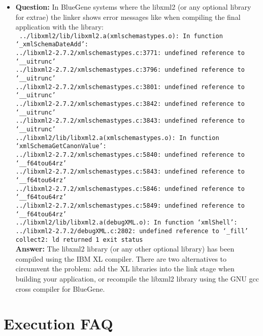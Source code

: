 \begin{itemize}
\item {\bf Question:} In BlueGene systems where the libxml2 (or any optional library for extrae) the linker shows error messages like when compiling the final application with the \TRACE library:\\
			{\tt
			../libxml2/lib/libxml2.a(xmlschemastypes.o): In function `\_xmlSchemaDateAdd':\\
			../libxml2-2.7.2/xmlschemastypes.c:3771: undefined reference to `\_\_uitrunc'\\
			../libxml2-2.7.2/xmlschemastypes.c:3796: undefined reference to `\_\_uitrunc'\\
			../libxml2-2.7.2/xmlschemastypes.c:3801: undefined reference to `\_\_uitrunc'\\
			../libxml2-2.7.2/xmlschemastypes.c:3842: undefined reference to `\_\_uitrunc'\\
			../libxml2-2.7.2/xmlschemastypes.c:3843: undefined reference to `\_\_uitrunc'\\
			../libxml2/lib/libxml2.a(xmlschemastypes.o): In function `xmlSchemaGetCanonValue':\\
			../libxml2-2.7.2/xmlschemastypes.c:5840: undefined reference to `\_\_f64tou64rz'\\
			../libxml2-2.7.2/xmlschemastypes.c:5843: undefined reference to `\_\_f64tou64rz'\\
			../libxml2-2.7.2/xmlschemastypes.c:5846: undefined reference to `\_\_f64tou64rz'\\
			../libxml2-2.7.2/xmlschemastypes.c:5849: undefined reference to `\_\_f64tou64rz'\\
			../libxml2/lib/libxml2.a(debugXML.o): In function `xmlShell':\\
			../libxml2-2.7.2/debugXML.c:2802: undefined reference to `\_fill'\\
			collect2: ld returned 1 exit status\\
			}
			{\bf Answer:  } The libxml2 library (or any other optional library) has been compiled using the IBM XL compiler. There are two alternatives to circumvent the problem: add the XL libraries into the link stage when building your application, or recompile the libxml2 library using the GNU gcc cross compiler for BlueGene.

\end{itemize}

\section{Execution FAQ}

